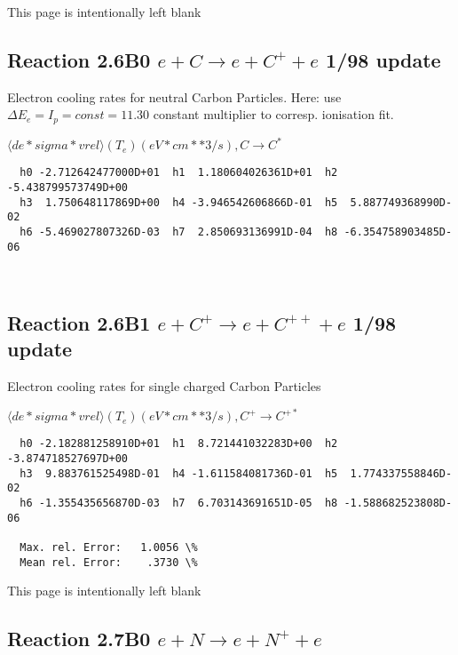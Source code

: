\documentclass[12pt,dvipdfmx]{article}
\begin{document}
\newpage
This page is intentionally left blank
\newpage

\subsection{
Reaction 2.6B0 $e + C \rightarrow e + C^+ + e  $ 1/98 update
}

 Electron cooling rates for neutral
 Carbon Particles. Here: use $\Delta E_e = I_p = const = 11.30$
 constant multiplier to corresp. ionisation fit.

$  \langle de*sigma*vrel \rangle(T_e)  (eV*cm**3/s), C   \rightarrow C^* $


\begin{small}\begin{verbatim}
  h0 -2.712642477000D+01  h1  1.180604026361D+01  h2 -5.438799573749D+00
  h3  1.750648117869D+00  h4 -3.946542606866D-01  h5  5.887749368990D-02
  h6 -5.469027807326D-03  h7  2.850693136991D-04  h8 -6.354758903485D-06



\end{verbatim}\end{small}

\subsection{
Reaction 2.6B1 $e + C^+ \rightarrow e + C^{++} + e  $ 1/98 update
}

 Electron cooling rates for single
 charged Carbon Particles

 $ \langle de*sigma*vrel \rangle(T_e)  (eV*cm**3/s), C^+ \rightarrow C^{+*} $


\begin{small}\begin{verbatim}
  h0 -2.182881258910D+01  h1  8.721441032283D+00  h2 -3.874718527697D+00
  h3  9.883761525498D-01  h4 -1.611584081736D-01  h5  1.774337558846D-02
  h6 -1.355435656870D-03  h7  6.703143691651D-05  h8 -1.588682523808D-06

  Max. rel. Error:   1.0056 \%
  Mean rel. Error:    .3730 \%

\end{verbatim}\end{small}

\newpage
This page is intentionally left blank
\newpage

\subsection{
Reaction 2.7B0 $e + N \rightarrow e + N^{+} + e  $
}
\end{document}
